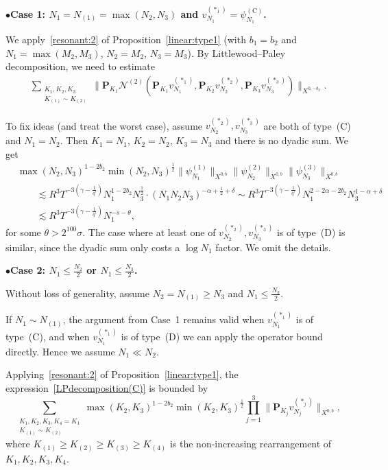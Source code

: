 \documentclass[11pt,reqno,english]{amsart}
\numberwithin{equation}{section}
\theoremstyle{plain}
\theoremstyle{definition}
\theoremstyle{remark}
\newcommand{\noi}{\noindent}
\begin{document}
\noi
$\bullet${\bf Case 1: $N_1=N_{(1)}=\max(N_2,N_3)$ and $v_{N_1}^{(\ast_1)}=\psi_{N_1}^{(\mathrm{C})}$.}

We apply~\eqref{resonant:2} of Proposition~\ref{linear:type1} (with $b_1=b_2$ and $N_1=\max(M_2,M_3)$, $N_2=M_2$, $N_3=M_3$).
By Littlewood--Paley decomposition, we need to estimate
\begin{align}\label{LPdecomposition(C)}
	\sum_{\substack{K_1,K_2,K_3\\
			K_{(1)}\sim K_{(2)}
	}}\|\mathbf{P}_{K_1}\mathcal{N}^{(2)}(\mathbf{P}_{K_1}v_{N_1}^{(\ast_1)},\mathbf{P}_{K_2}v_{N_2}^{(\ast_2)},\mathbf{P}_{K_3}v_{N_3}^{(\ast_3)})\|_{X^{0,-b_2}}.
\end{align}

To fix ideas (and treat the worst case), assume $v_{N_2}^{(\ast_2)},v_{N_3}^{(\ast_3)}$ are both of type~(C) and $N_1=N_2$. Then $K_1=N_1$, $K_2=N_2$, $K_3=N_3$ and there is no dyadic sum. We get
\begin{align*}
	&\max(N_2,N_3)^{1-2b_2}\min(N_2,N_3)^{\frac{1}{2}}\|\psi_{N_1}^{(1)}\|_{X^{0,b}}\|\psi_{N_2}^{(2)}\|_{X^{0,b}}\|\psi^{(3)}_{N_3}\|_{X^{0,b}}\\
	&\qquad\lesssim R^3 T^{-3(\gamma-\frac{1}{q'})}N_1^{1-2b_2}
	N_3^{\frac{1}{2}}
	\cdot (N_1 N_2 N_3)^{-\alpha+\frac{1}{2}+\delta} \sim R^3 T^{-3(\gamma-\frac{1}{q'})} N_1^{2-2\alpha-2b_2}N_3^{1-\alpha+\delta}\\
	&\qquad\lesssim R^3 T^{-3(\gamma-\frac{1}{q'})}N_1^{-s-\theta},
\end{align*}
for some $\theta>2^{100}\sigma$. The case where at least one of $v_{N_2}^{(\ast_2)},v_{N_3}^{(\ast_3)}$ is of type~(D) is similar, since the dyadic sum only costs a $\log N_1$ factor. We omit the details.

\medskip

\noi
$\bullet${\bf Case 2: $N_1\leq \frac{N_2}{2}$ or $N_1\leq \frac{N_3}{2}$.}

Without loss of generality, assume $N_2=N_{(1)}\geq N_3$ and $N_1\leq \frac{N_2}{2}$.

If $N_1\sim N_{(1)}$, the argument from Case~1 remains valid when $v_{N_1}^{(\ast_1)}$ is of type~(C), and when $v_{N_1}^{(\ast_1)}$ is of type~(D) we can apply the operator bound directly. Hence we assume $N_1\ll N_{2}$.

Applying~\eqref{resonant:2} of Proposition~\ref{linear:type1}, the expression~\eqref{LPdecomposition(C)} is bounded by
\[
	\sum_{\substack{K_1,K_2,K_3,K_4=K_1\\
			K_{(1)}\sim K_{(2)}
	}} \max(K_2,K_3)^{1-2b_2}\min(K_2,K_3)^{\frac{1}{2}}
	\prod_{j=1}^3\|\mathbf{P}_{K_j}v_{N_j}^{(\ast_j)}\|_{X^{0,b}},
\]
where $K_{(1)}\geq K_{(2)}\geq K_{(3)}\geq K_{(4)}$ is the non-increasing rearrangement of $K_1,K_2,K_3,K_4$.
\end{document}
